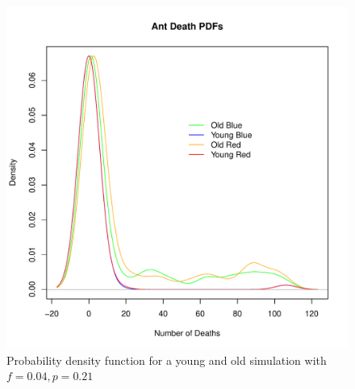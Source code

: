 \begin{enumerate}
\begin{figure}[h!]
\centering
\includegraphics[scale=0.80]{part5regime3v1.pdf}
\caption{Probability density function for a young and old simulation with $f = 
0.04, p = 0.21$}
\label{parte3fig}
\end{figure}

\end{enumerate}
